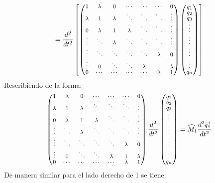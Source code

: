 \documentclass[11pt,letterpaper,twocolumn]{article}
\begin{document}
$${\fontsize{8}{8}\selectfont
=\frac { { d }^{ 2 } }{ d{ t }^{ 2 } } \begin{bmatrix} \begin{pmatrix} 1 & \lambda  & 0 & \cdots  & \cdots  & \cdots  & 0 \\ \lambda  & 1 & \lambda  & \ddots  & \ddots  & \ddots  & \vdots  \\ 0 & \lambda  & 1 & \lambda  & \ddots  & \ddots  & \vdots  \\ \vdots  & \ddots  & \lambda  & \ddots  & \ddots  & \ddots  & \vdots  \\ \vdots  & \ddots  & \ddots  & \ddots  & \ddots  & \lambda  & 0 \\ \vdots  & 0 & \ddots  & \ddots  & \lambda  & 1 & \lambda  \\ 0 & \cdots  & \cdots  & \cdots  & \cdots  & \lambda  & 1 \end{pmatrix}\begin{pmatrix} { q }_{ 1 } \\ { q }_{ 2 } \\ { q }_{ 3 } \\ \vdots  \\ \vdots  \\ \vdots  \\ \vdots  \\ { q }_{ n } \end{pmatrix} \end{bmatrix}}
$$
Rescribiendo de la forma:
$${\fontsize{8}{8}\selectfont
\begin{pmatrix} 1 & \lambda  & 0 & \cdots  & \cdots  & \cdots  & 0 \\ \lambda  & 1 & \lambda  & \ddots  & \ddots  & \ddots  & \vdots  \\ 0 & \lambda  & 1 & \lambda  & \ddots  & \ddots  & \vdots  \\ \vdots  & \ddots  & \lambda  & \ddots  & \ddots  & \ddots  & \vdots  \\ \vdots  & \ddots  & \ddots  & \ddots  & \ddots  & \lambda  & 0 \\ \vdots  & 0 & \ddots  & \ddots  & \lambda  & 1 & \lambda  \\ 0 & \cdots  & \cdots  & \cdots  & \cdots  & \lambda  & 1 \end{pmatrix}\frac { { d }^{ 2 } }{ d{ t }^{ 2 } } \begin{pmatrix} { q }_{ 1 } \\ { q }_{ 2 } \\ { q }_{ 3 } \\ \vdots  \\ \vdots  \\ \vdots  \\ \vdots  \\ { q }_{ n } \end{pmatrix}=\widehat{M}_{1}\frac {{d}^{2}\overrightarrow {{q}_{n}}}{d{t}^{2}}}$$
De manera similar para el lado derecho de 1 se tiene:
\end{document}
